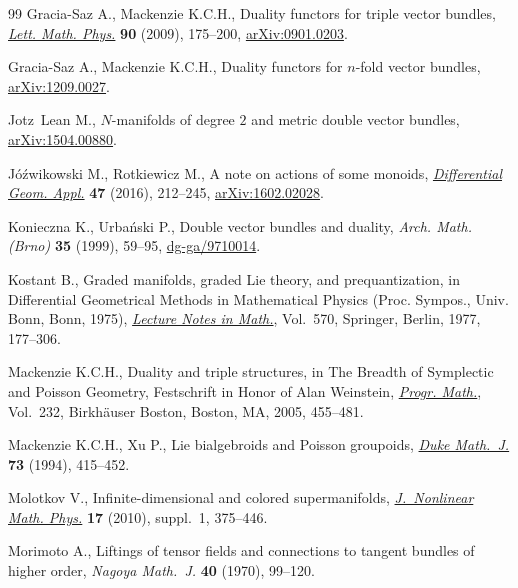 \begin{thebibliography}{99}
Gracia-Saz A., Mackenzie K.C.H., Duality functors for triple vector bundles,
  \href{http://dx.doi.org/10.1007/s11005-009-0346-z}{\textit{Lett. Math. Phys.}} \textbf{90} (2009), 175--200, \href{http://arxiv.org/abs/0901.0203}{arXiv:0901.0203}.

Gracia-Saz A., Mackenzie K.C.H., Duality functors for $n$-fold vector bundles,
  \href{http://arxiv.org/abs/1209.0027}{arXiv:1209.0027}.

Jotz~Lean M., $N$-manifolds of degree $2$ and metric double vector bundles,
  \href{http://arxiv.org/abs/1504.00880}{arXiv:1504.00880}.

J{\'o}{\'z}wikowski M., Rotkiewicz M., A note on actions of some monoids,
  \href{http://dx.doi.org/10.1016/j.difgeo.2016.04.003}{\textit{Differential Geom. Appl.}} \textbf{47} (2016), 212--245,
  \href{http://arxiv.org/abs/1602.02028}{arXiv:1602.02028}.

Konieczna K., Urba{\'n}ski P., Double vector bundles and duality, \textit{Arch.
  Math. (Brno)} \textbf{35} (1999), 59--95, \href{http://arxiv.org/abs/dg-ga/9710014}{dg-ga/9710014}.

Kostant B., Graded manifolds, graded {L}ie theory, and prequantization, in
  Dif\/ferential Geometrical Methods in Mathematical Physics ({P}roc. {S}ympos.,
  {U}niv. {B}onn, {B}onn, 1975), \href{http://dx.doi.org/10.1007/BFb0087788}{\textit{Lecture Notes in Math.}}, Vol.~570,
  Springer, Berlin, 1977, 177--306.

Mackenzie K.C.H., Duality and triple structures, in The Breadth of Symplectic
  and {P}oisson Geometry, Festschrift in Honor of Alan Weinstein,
  \href{http://dx.doi.org/10.1007/0-8176-4419-9_15}{\textit{Progr. Math.}}, Vol.~232, Birkh\"auser Boston, Boston, MA, 2005,
  455--481.

Mackenzie K.C.H., Xu P., Lie bialgebroids and {P}oisson groupoids, \href{http://dx.doi.org/10.1215/S0012-7094-94-07318-3}{\textit{Duke
  Math.~J.}} \textbf{73} (1994), 415--452.

Molotkov V., Inf\/inite-dimensional and colored supermanifolds,
  \href{http://dx.doi.org/10.1142/S140292511000088X}{\textit{J.~Nonlinear Math. Phys.}} \textbf{17} (2010), suppl.~1, 375--446.

Morimoto A., Liftings of tensor f\/ields and connections to tangent bundles of
  higher order, \textit{Nagoya Math.~J.} \textbf{40} (1970), 99--120.


\end{thebibliography}
